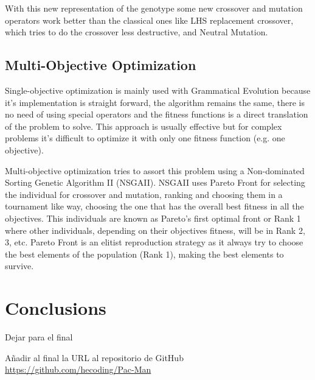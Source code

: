 \documentclass{llncs}
\begin{document}
With this new representation of the genotype some new crossover and mutation operators work better than the classical ones like LHS replacement crossover, which tries to do the crossover less destructive,
and Neutral Mutation. %

\subsection{Multi-Objective Optimization}
Single-objective optimization is mainly used with Grammatical Evolution because it's implementation is straight forward, the algorithm remains the same, there is no need of using special operators and the fitness functions is a direct translation of the problem to solve. This approach is usually effective but for complex problems it's difficult to optimize it with only one fitness function (e.g. one objective).

Multi-objective optimization tries to assort this problem using a Non-dominated Sorting Genetic Algorithm II (NSGAII). NSGAII uses Pareto Front %
for selecting the individual for crossover and mutation, ranking and choosing them in a tournament like way, choosing the one that has the overall best fitness in all the objectives. This individuals are known as Pareto's first optimal front or Rank 1 where other individuals, depending on their objectives fitness, will be in Rank 2, 3, etc. Pareto Front is an elitist reproduction strategy as it always try to choose the best elements of the population (Rank 1), making the best elements to survive. %

%
\section{Conclusions}
\label{sec:conclusions}
%


Dejar para el final

Añadir al final la URL al repositorio de GitHub
\url{https://github.com/hecoding/Pac-Man}



\end{document}

